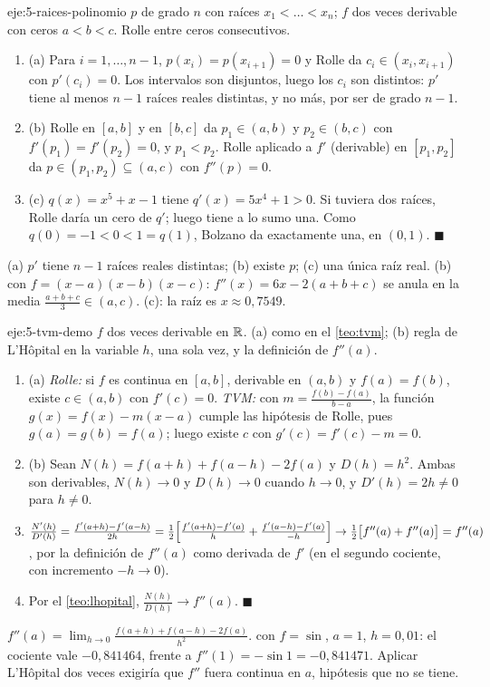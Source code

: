 \begin{solucion}{eje:5-raices-polinomio}
\datos $p$ de grado $n$ con raíces $x_1<\dots<x_n$; $f$ dos veces derivable con ceros $a<b<c$.
\planteamiento Rolle entre ceros consecutivos.
\pasos
\begin{enumerate}[label=\arabic*.]
  \item (a) Para $i=1,\dots,n-1$, $p(x_i)=p(x_{i+1})=0$ y Rolle da $c_i\in(x_i,x_{i+1})$ con $p'(c_i)=0$. Los intervalos son disjuntos, luego los $c_i$ son distintos: $p'$ tiene al menos $n-1$ raíces reales distintas, y no más, por ser de grado $n-1$.
  \item (b) Rolle en $[a,b]$ y en $[b,c]$ da $p_1\in(a,b)$ y $p_2\in(b,c)$ con $f'(p_1)=f'(p_2)=0$, y $p_1<p_2$. Rolle aplicado a $f'$ (derivable) en $[p_1,p_2]$ da $p\in(p_1,p_2)\subseteq(a,c)$ con $f''(p)=0$.
  \item (c) $q(x)=x^{5}+x-1$ tiene $q'(x)=5x^{4}+1>0$. Si tuviera dos raíces, Rolle daría un cero de $q'$; luego tiene a lo sumo una. Como $q(0)=-1<0<1=q(1)$, Bolzano da exactamente una, en $(0,1)$. \hfill$\blacksquare$
\end{enumerate}
\resultado (a) $p'$ tiene $n-1$ raíces reales distintas; (b) existe $p$; (c) una única raíz real.
\comprobacion (b) con $f=(x-a)(x-b)(x-c)$: $f''(x)=6x-2(a+b+c)$ se anula en la media $\frac{a+b+c}{3}\in(a,c)$. (c): la raíz es $x\approx0{,}7549$.
\end{solucion}

\begin{solucion}{eje:5-tvm-demo}
\datos $f$ dos veces derivable en $\mathbb{R}$.
\planteamiento (a) como en el \cref{teo:tvm}; (b) regla de L'Hôpital en la variable $h$, una sola vez, y la definición de $f''(a)$.
\pasos
\begin{enumerate}[label=\arabic*.]
  \item (a) \emph{Rolle:} si $f$ es continua en $[a,b]$, derivable en $(a,b)$ y $f(a)=f(b)$, existe $c\in(a,b)$ con $f'(c)=0$. \emph{TVM:} con $m=\frac{f(b)-f(a)}{b-a}$, la función $g(x)=f(x)-m(x-a)$ cumple las hipótesis de Rolle, pues $g(a)=g(b)=f(a)$; luego existe $c$ con $g'(c)=f'(c)-m=0$.
  \item (b) Sean $N(h)=f(a+h)+f(a-h)-2f(a)$ y $D(h)=h^{2}$. Ambas son derivables, $N(h)\to0$ y $D(h)\to0$ cuando $h\to0$, y $D'(h)=2h\ne0$ para $h\ne0$.
  \item $\frac{N'(h)}{D'(h)}=\frac{f'(a+h)-f'(a-h)}{2h}=\frac12\Bigl[\frac{f'(a+h)-f'(a)}{h}+\frac{f'(a-h)-f'(a)}{-h}\Bigr]\to\frac12\bigl[f''(a)+f''(a)\bigr]=f''(a)$, por la definición de $f''(a)$ como derivada de $f'$ (en el segundo cociente, con incremento $-h\to0$).
  \item Por el \cref{teo:lhopital}, $\frac{N(h)}{D(h)}\to f''(a)$. \hfill$\blacksquare$
\end{enumerate}
\resultado $f''(a)=\lim_{h\to0}\frac{f(a+h)+f(a-h)-2f(a)}{h^{2}}$.
\comprobacion con $f=\sin$, $a=1$, $h=0{,}01$: el cociente vale $-0{,}841464$, frente a $f''(1)=-\sin1=-0{,}841471$. Aplicar L'Hôpital dos veces exigiría que $f''$ fuera continua en $a$, hipótesis que no se tiene.
\end{solucion}

